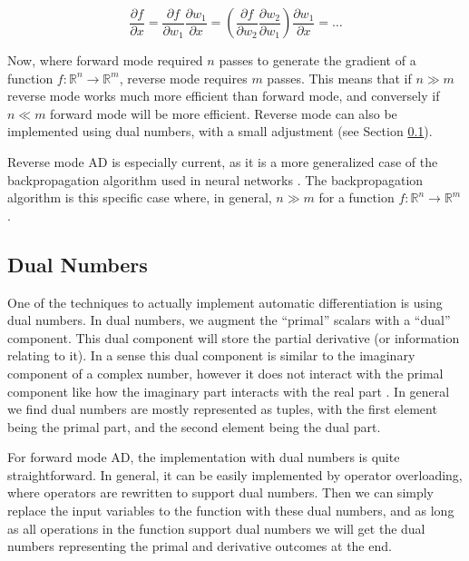 \documentclass{article}
\begin{document}
                \begin{equation} \label{eq:reversemode}
                    \frac{\partial f}{\partial x}=\frac{\partial f}{\partial w_1}\frac{\partial w_1}{\partial x}=\left(\frac{\partial f}{\partial w_2}\frac{\partial w_2}{\partial w_1}\right)\frac{\partial w_1}{\partial x}=\dots
                \end{equation}

                Now, where forward mode required $n$ passes to generate the gradient of a function $f:\mathbb{R}^n\to\mathbb{R}^m$, reverse mode requires $m$ passes.
                This means that if $n\gg m$ reverse mode works much more efficient than forward mode, and conversely if $n\ll m$ forward mode will be more efficient.
                Reverse mode can also be implemented using dual numbers, with a small adjustment (see Section \ref{ssec:dualnumbers}).

                Reverse mode AD is especially current, as it is a more generalized case of the backpropagation algorithm used in neural networks \cite{baydin2018survey,wang2019demystifying}.
                The backpropagation algorithm is this specific case where, in general, $n\gg m$ for a function $f:\mathbb{R}^n\to\mathbb{R}^m$.
            
        \subsection{Dual Numbers} \label{ssec:dualnumbers}
            One of the techniques to actually implement automatic differentiation is using dual numbers.
            In dual numbers, we augment the ``primal'' scalars with a ``dual'' component.
            This dual component will store the partial derivative (or information relating to it).
            In a sense this dual component is similar to the imaginary component of a complex number, however it does not interact with the primal component like how the imaginary part interacts with the real part \cite{margossian2019review}.
            In general we find dual numbers are mostly represented as tuples, with the first element being the primal part, and the second element being the dual part.

            For forward mode AD, the implementation with dual numbers is quite straightforward.
            In general, it can be easily implemented by operator overloading, where operators are rewritten to support dual numbers.
            Then we can simply replace the input variables to the function with these dual numbers, and as long as all operations in the function support dual numbers we will get the dual numbers representing the primal and derivative outcomes at the end.
            
\end{document}
